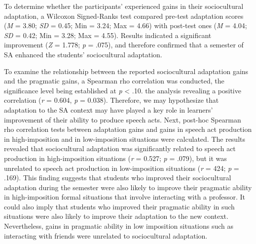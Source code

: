 \documentclass[12pt]{article}
\newenvironment{styleStandard}{\setlength\leftskip{0cm}\setlength\rightskip{0cm plus 1fil}\setlength\parindent{0cm}\setlength\parfillskip{0pt plus 1fil}\setlength\parskip{0in plus 1pt}\writerlistparindent\writerlistleftskip\leavevmode\normalfont\normalsize\writerlistlabel\ignorespaces}{\unskip\vspace{0.111in plus 0.0111in}\par}
\newcommand\writerlistleftskip{}
\newcommand\writerlistparindent{}
\newcommand\writerlistlabel{}
\begin{document}
\begin{styleStandard}
To determine whether the participants’ experienced gains in their sociocultural adaptation, a Wilcoxon Signed-Ranks test compared pre-test adaptation scores (\textit{M} = 3.80; \textit{SD} = 0.45; Min = 3.24; Max = 4.66) with post-test ones (\textit{M} = 4.04; \textit{SD} = 0.42; Min = 3.28; Max = 4.55). Results indicated a significant improvement (\textit{Z} = 1.778; \textit{p} = .075), and therefore confirmed that a semester of SA enhanced the students’ sociocultural adaptation. 
\end{styleStandard}

\begin{styleStandard}
To examine the relationship between the reported sociocultural adaptation gains and the pragmatic gains, a Spearman rho correlation was conducted, the significance level being established at \textit{p} {\textless} .10. the analysis revealing a positive correlation (\textit{r} = 0.604, \textit{p} = 0.038). Therefore, we may hypothesize that adaptation to the SA context may have played a key role in learners’ improvement of their ability to produce speech acts. Next, post-hoc Spearman rho correlation tests between adaptation gains and gains in speech act production in high-imposition and in low-imposition situations were calculated. The results revealed that sociocultural adaptation was significantly related to speech act production in high-imposition situations (\textit{r} = 0.527; \textit{p} = .079), but it was unrelated to speech act production in low-imposition situations (\textit{r} = 424; \textit{p} = .169). This finding suggests that students who improved their sociocultural adaptation during the semester were also likely to improve their pragmatic ability in high-imposition formal situations that involve interacting with a professor. It could also imply that students who improved their pragmatic ability in such situations were also likely to improve their adaptation to the new context. Nevertheless, gains in pragmatic ability in low imposition situations such as interacting with friends were unrelated to sociocultural adaptation. 
\end{styleStandard}
\end{document}

